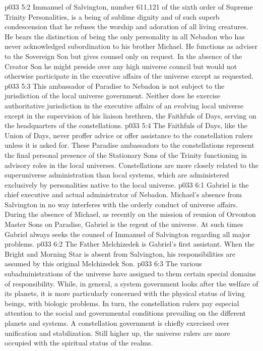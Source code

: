 \vs p033 5:2 Immanuel of Salvington, number 611,121 of the sixth order of Supreme Trinity Personalities, is a being of sublime dignity and of such superb condescension that he refuses the worship and adoration of all living creatures. He bears the distinction of being the only personality in all Nebadon who has never acknowledged subordination to his brother Michael. He functions as adviser to the Sovereign Son but gives counsel only on request. In the absence of the Creator Son he might preside over any high universe council but would not otherwise participate in the executive affairs of the universe except as requested.
\vs p033 5:3 This ambassador of Paradise to Nebadon is not subject to the jurisdiction of the local universe government. Neither does he exercise authoritative jurisdiction in the executive affairs of an evolving local universe except in the supervision of his liaison brethren, the Faithfuls of Days, serving on the headquarters of the constellations.
\vs p033 5:4 The Faithfuls of Days, like the Union of Days, never proffer advice or offer assistance to the constellation rulers unless it is asked for. These Paradise ambassadors to the constellations represent the final personal presence of the Stationary Sons of the Trinity functioning in advisory roles in the local universes. Constellations are more closely related to the superuniverse administration than local systems, which are administered exclusively by personalities native to the local universe.
\vs p033 6:1 Gabriel is the chief executive and actual administrator of Nebadon. Michael’s absence from Salvington in no way interferes with the orderly conduct of universe affairs. During the absence of Michael, as recently on the mission of reunion of Orvonton Master Sons on Paradise, Gabriel is the regent of the universe. At such times Gabriel always seeks the counsel of Immanuel of Salvington regarding all major problems.
\vs p033 6:2 The Father Melchizedek is Gabriel’s first assistant. When the Bright and Morning Star is absent from Salvington, his responsibilities are assumed by this original Melchizedek Son.
\vs p033 6:3 \pc The various subadministrations of the universe have assigned to them certain special domains of responsibility. While, in general, a system government looks after the welfare of its planets, it is more particularly concerned with the physical status of living beings, with biologic problems. In turn, the constellation rulers pay especial attention to the social and governmental conditions prevailing on the different planets and systems. A constellation government is chiefly exercised over unification and stabilization. Still higher up, the universe rulers are more occupied with the spiritual status of the realms.
